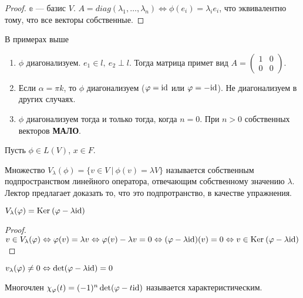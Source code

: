 \begin{proof}
    $\mathbb{e}$ --- базис $V$. $A = diag(\lambda_1, \ldots, \lambda_n) \Leftrightarrow \phi(e_i) = \lambda_i e_i$, что эквивалентно тому, что все векторы собственные.
\end{proof}
В примерах выше
\begin{enumerate}
    \item $\phi$ диагонализуем. $e_1 \in l,\ e_2 \perp l$. Тогда матрица примет вид $A = \begin{pmatrix}
        1 &0 \\
        0 &0
    \end{pmatrix}$.
    \item Если $\alpha = \pi k$, то $\phi$ диагонализуем ($\varphi = \mathrm{id}$ или $\varphi = - \mathrm{id}$). Не диагонализуем в других случаях.
    \item $\phi$ диагонализуем тогда и только тогда, когда $n = 0$. При $n > 0$ собственных векторов \textbf{МАЛО}.
\end{enumerate}
Пусть $\phi\in L(V)$, $x\in F$. 
\begin{Def}
    Множество $V_{\lambda}(\phi) = \{v\in V\ |\ \phi(v) = \lambda V\}$ называется собственным подпространством линейного оператора, отвечающим собственному значению $\lambda$. Лектор предлагает доказать то, что это подпротранство, в качестве упражнения.
\end{Def}
\begin{Suggestion}
    $V_\lambda(\varphi) = \mathrm{Ker}\:(\varphi - \lambda\mathrm{id})$
\end{Suggestion}
\begin{proof}
    $v \in V_{\lambda}(\varphi) \Leftrightarrow \varphi(v) = \lambda v \Leftrightarrow \varphi(v) - \lambda v = 0 \Leftrightarrow (\varphi - \lambda \mathrm{id})(v) = 0  \Leftrightarrow v \in \mathrm{Ker}\:(\varphi - \lambda \mathrm{id})$
\end{proof}
\begin{Consequence}
    $v_{\lambda}(\varphi) \neq 0 \Leftrightarrow \det(\varphi - \lambda \mathrm{id}) = 0$
\end{Consequence}
\begin{Def}
    Многочлен $\chi_{\varphi}(t) = (-1)^n\det(\varphi - t \mathrm{id})$ называется характеристическим.
\end{Def}

